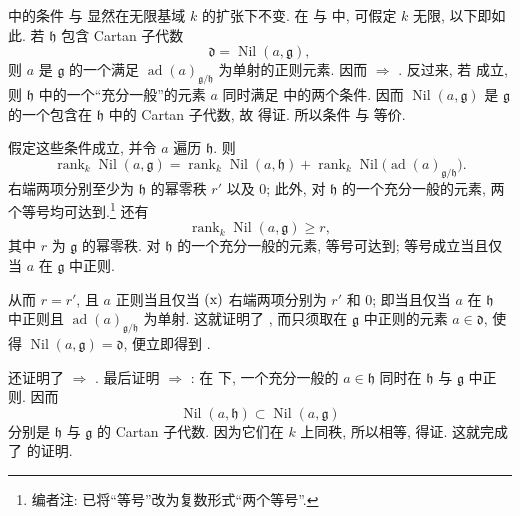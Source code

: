  中的条件  与  显然在无限基域 \(k\) 的扩张下不变. 在  与  中, 可假定 \(k\) 无限, 以下即如此. 若 \(\mathfrak h\) 包含 Cartan 子代数
\[
  \mathfrak d=\operatorname{Nil}(a,\mathfrak g),
\]
则 \(a\) 是 \(\mathfrak g\) 的一个满足 \(\operatorname{ad}(a)_{\mathfrak g/\mathfrak h}\) 为单射的正则元素. 因而  \(\Rightarrow\) . 反过来, 若  成立, 则 \(\mathfrak h\) 中的一个“充分一般”的元素 \(a\) 同时满足  中的两个条件. 因而 \(\operatorname{Nil}(a,\mathfrak g)\) 是 \(\mathfrak g\) 的一个包含在 \(\mathfrak h\) 中的 Cartan 子代数, 故  得证. 所以条件  与  等价.

假定这些条件成立, 并令 \(a\) 遍历 \(\mathfrak h\). 则
\[
\tag{x}
  \operatorname{rank}_k\operatorname{Nil}(a,\mathfrak g)
  =
  \operatorname{rank}_k\operatorname{Nil}(a,\mathfrak h)
  +
  \operatorname{rank}_k
  \operatorname{Nil}\bigl(
    \operatorname{ad}(a)_{\mathfrak g/\mathfrak h}
  \bigr).
\]
右端两项分别至少为 \(\mathfrak h\) 的幂零秩 \(r'\) 以及 \(0\); 此外, 对 \(\mathfrak h\) 的一个充分一般的元素, 两个等号均可达到.\footnote{编者注: 已将“等号”改为复数形式“两个等号”.} 还有
\[
  \operatorname{rank}_k\operatorname{Nil}(a,\mathfrak g)\geq r,
\]
其中 \(r\) 为 \(\mathfrak g\) 的幂零秩. 对 \(\mathfrak h\) 的一个充分一般的元素, 等号可达到; 等号成立当且仅当 \(a\) 在 \(\mathfrak g\) 中正则.

从而 \(r=r'\), 且 \(a\) 正则当且仅当 \(\SGARefLink{sga3:xiii:equation:4:8:x}{\mathrm{(x)}}\) 右端两项分别为 \(r'\) 和 \(0\); 即当且仅当 \(a\) 在 \(\mathfrak h\) 中正则且 \(\operatorname{ad}(a)_{\mathfrak g/\mathfrak h}\) 为单射. 这就证明了 , 而只须取在 \(\mathfrak g\) 中正则的元素 \(a\in\mathfrak d\), 使得 \(\operatorname{Nil}(a,\mathfrak g)=\mathfrak d\), 便立即得到 .

还证明了  \(\Rightarrow\) . 最后证明  \(\Rightarrow\) : 在  下, 一个充分一般的 \(a\in\mathfrak h\) 同时在 \(\mathfrak h\) 与 \(\mathfrak g\) 中正则. 因而
\[
  \operatorname{Nil}(a,\mathfrak h)
  \subset
  \operatorname{Nil}(a,\mathfrak g)
\]
分别是 \(\mathfrak h\) 与 \(\mathfrak g\) 的 Cartan 子代数. 因为它们在 \(k\) 上同秩, 所以相等,  得证. 这就完成了  的证明.

